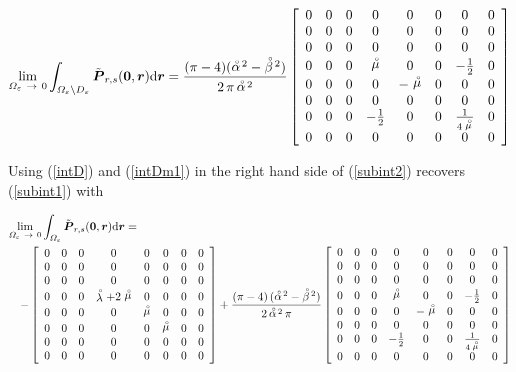 \begin{equation} \label{intDm1}
\lim\limits_{{\mit \Omega }_{ \varepsilon }\ \rightarrow  \ 
0}\int_{{\mit \Omega }_{ \varepsilon }\backslash{\mit D}_{ \varepsilon }}{\tilde{\bmi  P}_{r,s}}({\bf 
0},{\bmi  r}){\rm d}{\bmi r}=
{{({\pi - 4})( {\rf{\alpha}\!{}^2} - {\rf{\beta}\!{}^2})}\over 
   {2\, \pi\,{\rf{\alpha}\!{}^2}}}
   \left[\begin{array}{cccccccc} 0&0&0&0&0&0&0&0\\ 0&0&0&0&0&0&0&0\\ 0&0&0&0&0&0&0&0\\
   0&0&0&\rf{\mu}&0&0&-{1\over 2}&0\\ 0&0&0&0&-\rf{\mu}&0&0&0\\
   0&0&0&0&0&0&0&0\\ 0&0&0&-{1\over 2}&0&0&{1\over {4\,\rf{\mu}}}&0\\
   0&0&0&0&0&0&0&0\end{array}\right]
\end{equation}

Using (\ref{intD}) and (\ref{intDm1}) in the right hand side of 
(\ref{subint2}) recovers (\ref{subint1})
with
\begin{samepage}
\begin{eqnarray}  \label{Gepsint}
\lefteqn{
\lim\limits_{{\mit \Omega }_{ \varepsilon }\ \rightarrow  \ 
0}\int_{{\mit \Omega }_{ \varepsilon }}{\tilde{\bmi  P}_{r,s}}({\bf 
0},{\bmi  r}){\rm d}{\bmi r}=}\\
&&
-  \left[\begin{array}{cccccccc} 
   0&0&0&0&0&0&0&0\\ 0&0&0&0&0&0&0&0\\ 0&0&0&0&0&0&0&0\\
   0&0&0&\rf{\lambda}+2 \rf{\mu}&0&0&0&0\\ 0&0&0&0&\rf{\mu}&0&0&0\\
   0&0&0&0&0&\rf{\mu}&0&0\\ 0&0&0&0&0&0&0&0\\
   0&0&0&0&0&0&0&0\end{array}\right]
+
{{\left({\pi - 4}\right)( {\rf{\alpha}\!{}^2} - {\rf{\beta}\!{}^2} )}\over 
   {2\,{\rf{\alpha}\!{}^2}\,\pi}}
   \left[\begin{array}{cccccccc} 0&0&0&0&0&0&0&0\\ 0&0&0&0&0&0&0&0\\ 0&0&0&0&0&0&0&0\\
   0&0&0&\rf{\mu}&0&0&-{1\over 2}&0\\ 0&0&0&0&-\rf{\mu}&0&0&0\\
   0&0&0&0&0&0&0&0\\ 0&0&0&-{1\over 2}&0&0&{1\over {4\,\rf{\mu}}}&0\\
   0&0&0&0&0&0&0&0\end{array}\right]\nonumber
\end{eqnarray}
\end{samepage}

